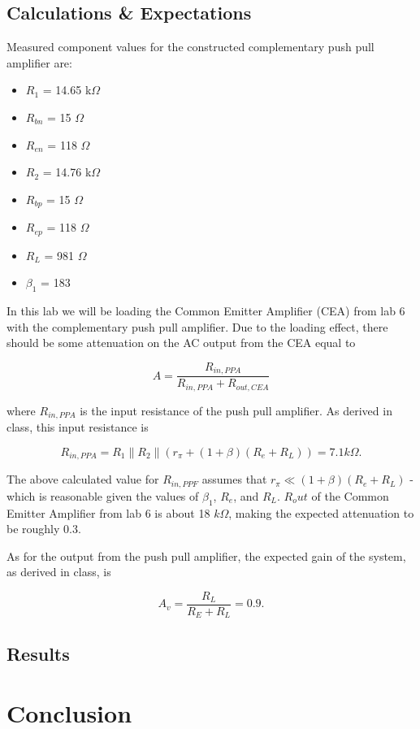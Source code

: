 \documentclass[12pt,letterpaper]{report}
\newcommand{\parallelsum}{\mathbin{\|}}
\begin{document}
\subsection*{Calculations \& Expectations}

Measured component values for the constructed complementary push pull amplifier are:
\begin{itemize}
\item $R_1$ = 14.65 k$\Omega$
\item $R_{bn}$ = 15 $\Omega$
\item $R_{en}$ = 118 $\Omega$

\item $R_2$ = 14.76 k$\Omega$
\item $R_{bp}$ = 15 $\Omega$
\item $R_{ep}$ = 118 $\Omega$

\item $R_L$ = 981 $\Omega$
\item $\beta_{1}$ = 183
\end{itemize}

In this lab we will be loading the Common Emitter Amplifier (CEA) from lab 6 with the complementary push pull amplifier. Due to the loading effect, there should be some attenuation on the AC output from the CEA equal to

$$
A = \frac{R_{in,PPA}}{R_{in,PPA} + R_{out,CEA}}
$$

where $R_{in,PPA}$ is the input resistance of the push pull amplifier. As derived in class, this input resistance is

$$
R_{in,PPA} = R_1 \parallelsum R_2 \parallelsum (r_{\pi} + (1 + \beta)(R_e + R_L)) = 7.1 k\Omega.
$$

The above calculated value for $R_{in,PPF}$ assumes that $r_{\pi} \ll (1 + \beta)(R_e + R_L)$ - which is reasonable given the values of $\beta_1$, $R_e$, and $R_L$. $R_out$ of the Common Emitter Amplifier from lab 6 is about 18 $k\Omega$, making the expected attenuation to be roughly 0.3.

As for the output from the push pull amplifier, the expected gain of the system, as derived in class, is

$$
A_v = \frac{R_L}{R_E  + R_L} = 0.9.
$$


\subsection*{Results}



\section*{Conclusion}
\end{document}
